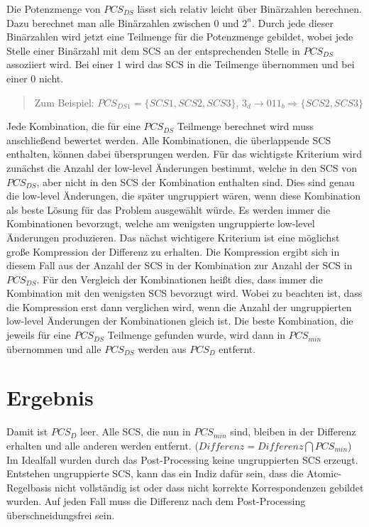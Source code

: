 Die Potenzmenge von $PCS_{DS}$ lässt sich relativ leicht über Binärzahlen berechnen. Dazu berechnet
man alle Binärzahlen zwischen $0$ und $2^n$. Durch jede dieser Binärzahlen wird jetzt eine Teilmenge
für die Potenzmenge gebildet, wobei jede Stelle einer Binärzahl mit dem SCS an der entsprechenden
Stelle in $PCS_{DS}$ assoziiert wird. Bei einer 1 wird das SCS in die Teilmenge übernommen und
bei einer 0 nicht. 

\begin{quote}
Zum Beispiel: $PCS_{DS1} = \{SCS1, SCS2, SCS3\}$, $3_d \rightarrow 011_b \Rightarrow \{SCS2, SCS3\}$
\end{quote}

Jede Kombination, die für eine $PCS_{DS}$ Teilmenge berechnet wird muss anschließend bewertet
werden. Alle Kombinationen, die überlappende SCS enthalten, können dabei übersprungen werden. Für
das wichtigste Kriterium wird zunächst die Anzahl der low-level Änderungen bestimmt, welche in den SCS
von $PCS_{DS}$, aber nicht in den SCS der Kombination enthalten sind. Dies sind genau die low-level
Änderungen, die später ungruppiert wären, wenn diese Kombination als beste Lösung für das Problem
ausgewählt würde. Es werden immer die Kombinationen bevorzugt, welche am wenigsten ungruppierte
low-level Änderungen produzieren. Das nächst wichtigere Kriterium ist eine möglichst große
Kompression der Differenz zu erhalten. Die Kompression ergibt sich in diesem Fall aus der Anzahl der
SCS in der Kombination zur Anzahl der SCS in $PCS_{DS}$. Für den Vergleich der Kombinationen heißt
dies, dass immer die Kombination mit den wenigsten SCS bevorzugt wird. Wobei zu beachten ist, dass
die Kompression erst dann verglichen wird, wenn die Anzahl der ungruppierten low-level Änderungen
der Kombinationen gleich ist. Die beste Kombination, die jeweils für eine $PCS_{DS}$ Teilmenge
gefunden wurde, wird dann in $PCS_{min}$ übernommen und alle $PCS_{DS}$ werden aus $PCS_D$ entfernt.

\section{Ergebnis}

Damit ist $PCS_D$ leer. Alle SCS, die nun in $PCS_{min}$ sind, bleiben in der Differenz erhalten und
alle anderen werden entfernt. ($Differenz = Differenz \bigcap PCS_{min}$)  Im Idealfall wurden
durch das Post-Processing keine ungruppierten SCS erzeugt. Entstehen ungruppierte SCS, kann das ein
Indiz dafür sein, dass die Atomic-Regelbasis nicht vollständig ist oder dass nicht korrekte Korrespondenzen
gebildet wurden. Auf jeden Fall muss die Differenz nach dem Post-Processing überschneidungsfrei
sein.
